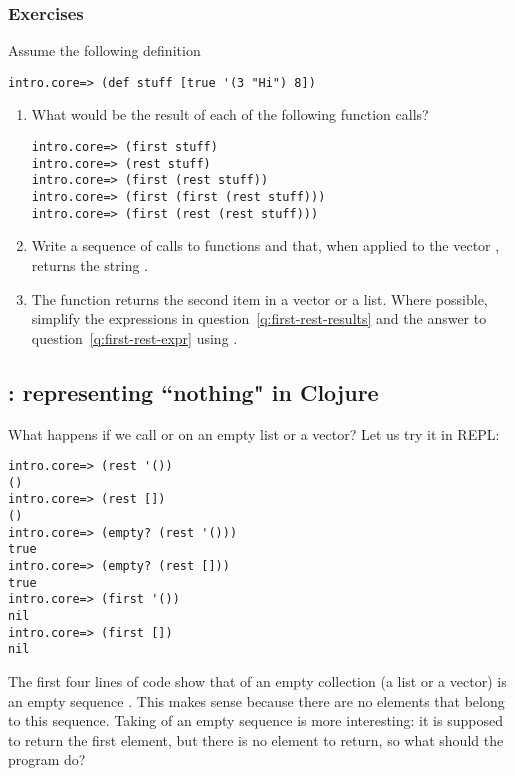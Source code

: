 \subsubsection{Exercises}\label{subsub:lists-vectors-exercises}
\begin{exercise}
Assume the following definition
\begin{framed}
\begin{verbatim}
intro.core=> (def stuff [true '(3 "Hi") 8])
\end{verbatim}
\end{framed}
\begin{enumerate}
\item\label{q:first-rest-results} What would be the result of each of the following function calls? 
\begin{framed}
\begin{verbatim}
intro.core=> (first stuff)
intro.core=> (rest stuff)
intro.core=> (first (rest stuff))
intro.core=> (first (first (rest stuff)))
intro.core=> (first (rest (rest stuff)))
\end{verbatim}
\end{framed}
\item\label{q:first-rest-expr} Write a sequence of calls to functions  and  that, when applied to the vector , returns the string . 
\item\label{q:second} The function  returns the second item in a vector or a list. Where possible, simplify the expressions in question~\ref{q:first-rest-results} and the answer to question~\ref{q:first-rest-expr} using .
\end{enumerate}
\end{exercise}


\subsection{: representing ``nothing" in Clojure}\label{subsec:nil}
What happens if we call  or  on an empty list or a vector?  Let us try it in REPL:
\begin{framed}
\begin{verbatim}
intro.core=> (rest '())
()
intro.core=> (rest [])
()
intro.core=> (empty? (rest '()))
true
intro.core=> (empty? (rest []))
true
intro.core=> (first '())
nil
intro.core=> (first [])
nil
\end{verbatim}
\end{framed}
The first four lines of code show that  of an empty collection (a list or a vector) is an empty sequence \clocode{()}. This makes sense because there are no elements that belong to this sequence. Taking  of an empty sequence is more interesting: it is supposed to return the first element, but there is no element to return, so what should the program do? 

